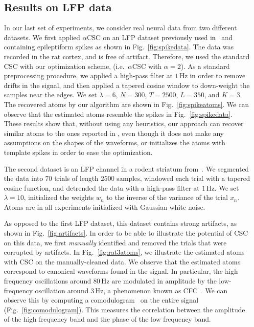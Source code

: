 \subsection{Results on LFP data}
In our last set of experiments, we consider real neural data from two different datasets. 
%
We first applied $\alpha$CSC on an LFP dataset previously used in~\cite{hitziger2017adaptive} and containing epileptiform spikes as shown in Fig.~\ref{fig:spikedata}. The data was recorded in the rat cortex, and  is free of artifact. Therefore, we used the standard CSC with our optimization scheme, (i.e.\ $\alpha$CSC with $\alpha=2$).
%
As a standard preprocessing procedure, we applied a high-pass filter at $1$\,Hz in order to remove drifts in the signal, and then applied a tapered cosine window to down-weight the samples near the edges. We set $\lambda=6$, $N=300$, $T=2500$, $L=350$, and $K=3$. The recovered atoms by our algorithm are shown in Fig.~\ref{fig:spikeatoms}. We can observe that the estimated atoms resemble the spikes in Fig.~\ref{fig:spikedata}. These results show that, without using any heuristics, our approach can recover similar atoms to the ones reported in \cite{hitziger2017adaptive}, even though it does not make any assumptions on the shapes of the waveforms, or initializes the atoms with template spikes in order to ease the optimization.





The second dataset is an LFP channel in a rodent striatum from~\cite{dallerac2017updating}. We segmented the data into $70$ trials of length $2500$ samples, windowed each trial with a tapered cosine function, and detrended the data with a high-pass filter at $1$\,Hz.
We set $\lambda=10$, initialized the weights $w_n$ to the inverse of the variance of the trial $x_n$. Atoms are in all experiments initialized with Gaussian white noise.



As opposed to the first LFP dataset, this dataset contains strong artifacts, as shown in Fig.~\ref{fig:artifacts}. In order to be able to illustrate the potential of CSC on this data, we first \emph{manually} identified and removed the trials that were corrupted by artifacts. In Fig.~\ref{fig:rat3atoms}, we illustrate the estimated atoms with CSC on the manually-cleaned data. We observe that the estimated atoms correspond to canonical waveforms found in the signal. In particular, the high frequency oscillations around $80$\,Hz are modulated in amplitude by the low-frequency oscillation around $3$\,Hz, a phenomenon known as \ac{CFC}~\citep{jensen2007cross}. We can observe this by computing a comodulogram~\citep{tort2010measuring} on the entire signal (Fig.~\ref{fig:comodulogram}). This measures the correlation between the amplitude of the high frequency band and the phase of the low frequency band. 



